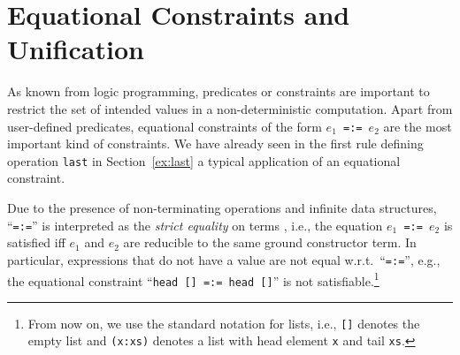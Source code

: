 \documentclass{llncs}
\newcommand{\code}[1]{\mbox{\small\texttt{#1}}}
\newcommand{\ccode}[1]{``\code{#1}''}
\begin{document}
\section{Equational Constraints and Unification}
\label{sec:Unification}

As known from logic programming, predicates or constraints
are important to restrict the set of intended values
in a non-deterministic computation.
Apart from user-defined predicates,
equational constraints of the form \code{$e_1$\,=:=\,$e_2$}
are the most important kind of constraints.
We have already seen in the first rule defining operation
\code{last} in Section~\ref{ex:last} a typical application
of an equational constraint.

Due to the presence of non-terminating operations
and infinite data structures,
\ccode{=:=} is interpreted as the \emph{strict equality} on terms
\cite{GiovannettiLeviMoisoPalamidessi91},
i.e., the equation \code{$e_1$\,=:=\,$e_2$} is satisfied iff
$e_1$ and $e_2$ are reducible to the same ground constructor term.
In particular, expressions that do not have a value
are not equal w.r.t.\ \ccode{=:=}, e.g.,
the equational constraint \ccode{head [] =:= head []}
is not satisfiable.\footnote{From now on, we use the
standard notation for lists, i.e., \code{[]} denotes the empty list
and \code{(x:xs)} denotes a list with head element \code{x}
and tail \code{xs}.}
\end{document}

